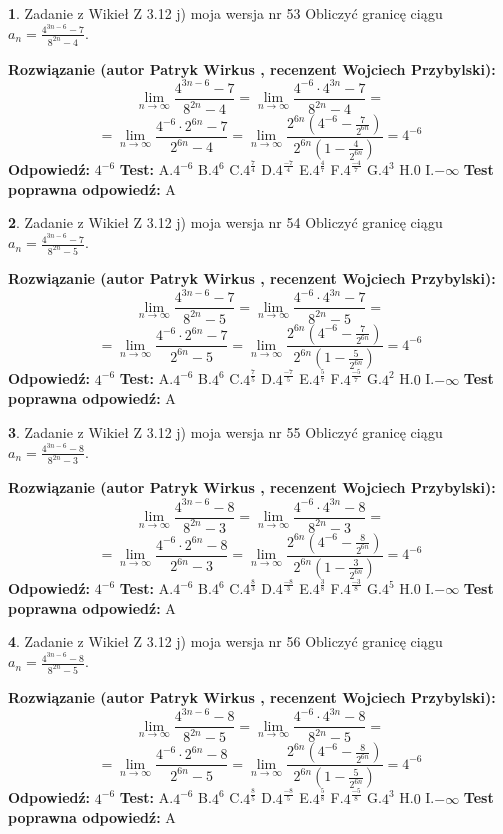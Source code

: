 \documentclass[12pt, a4paper]{article}
\theoremstyle{definition} %
\newtheorem{zad}{}
\newcommand{\zadStart}[1]{\begin{zad}#1\newline}
\newcommand{\zadStop}{\end{zad}}
\newcommand{\rozwStart}[2]{\noindent \textbf{Rozwiązanie (autor #1 , recenzent #2): }\newline}
\newcommand{\rozwStop}{\newline}
\newcommand{\odpStart}{\noindent \textbf{Odpowiedź:}\newline}
\newcommand{\odpStop}{\newline}
\newcommand{\testStart}{\noindent \textbf{Test:}\newline}
\newcommand{\testStop}{\newline}
\newcommand{\kluczStart}{\noindent \textbf{Test poprawna odpowiedź:}\newline}
\newcommand{\kluczStop}{\newline}
\begin{document}
\zadStart{Zadanie z Wikieł Z 3.12 j) moja wersja nr 53}
Obliczyć granicę ciągu $a_{n}=\frac{4^{3n-6}-7}{8^{2n}-4}$.
\zadStop
\rozwStart{Patryk Wirkus}{Wojciech Przybylski}
$$\lim\limits_{n\to\infty}\frac{4^{3n-6}-7}{8^{2n}-4}= \lim\limits_{n\to\infty}\frac{4^{-6} \cdot 4^{3n}-7}{8^{2n}-4}=$$
$$= \lim\limits_{n\to\infty}\frac{4^{-6} \cdot 2^{6n}-7}{2^{6n}-4}= \lim\limits_{n\to\infty}\frac{2^{6n}(4^{-6} - \frac{7}{2^{6n}})}{2^{6n}(1-\frac{4}{2^{6n}})}= 4^{-6}$$
\rozwStop
\odpStart
$4^{-6}$
\odpStop
\testStart
A.$4^{-6}$
B.$4^{6}$
C.$4^{\frac{7}{4}}$
D.$4^{\frac{-7}{4}}$
E.$4^{\frac{4}{7}}$
F.$4^{\frac{-4}{7}}$
G.$4^{3}$
H.$0$
I.$-\infty$
\testStop
\kluczStart
A
\kluczStop



\zadStart{Zadanie z Wikieł Z 3.12 j) moja wersja nr 54}
Obliczyć granicę ciągu $a_{n}=\frac{4^{3n-6}-7}{8^{2n}-5}$.
\zadStop
\rozwStart{Patryk Wirkus}{Wojciech Przybylski}
$$\lim\limits_{n\to\infty}\frac{4^{3n-6}-7}{8^{2n}-5}= \lim\limits_{n\to\infty}\frac{4^{-6} \cdot 4^{3n}-7}{8^{2n}-5}=$$
$$= \lim\limits_{n\to\infty}\frac{4^{-6} \cdot 2^{6n}-7}{2^{6n}-5}= \lim\limits_{n\to\infty}\frac{2^{6n}(4^{-6} - \frac{7}{2^{6n}})}{2^{6n}(1-\frac{5}{2^{6n}})}= 4^{-6}$$
\rozwStop
\odpStart
$4^{-6}$
\odpStop
\testStart
A.$4^{-6}$
B.$4^{6}$
C.$4^{\frac{7}{5}}$
D.$4^{\frac{-7}{5}}$
E.$4^{\frac{5}{7}}$
F.$4^{\frac{-5}{7}}$
G.$4^{2}$
H.$0$
I.$-\infty$
\testStop
\kluczStart
A
\kluczStop



\zadStart{Zadanie z Wikieł Z 3.12 j) moja wersja nr 55}
Obliczyć granicę ciągu $a_{n}=\frac{4^{3n-6}-8}{8^{2n}-3}$.
\zadStop
\rozwStart{Patryk Wirkus}{Wojciech Przybylski}
$$\lim\limits_{n\to\infty}\frac{4^{3n-6}-8}{8^{2n}-3}= \lim\limits_{n\to\infty}\frac{4^{-6} \cdot 4^{3n}-8}{8^{2n}-3}=$$
$$= \lim\limits_{n\to\infty}\frac{4^{-6} \cdot 2^{6n}-8}{2^{6n}-3}= \lim\limits_{n\to\infty}\frac{2^{6n}(4^{-6} - \frac{8}{2^{6n}})}{2^{6n}(1-\frac{3}{2^{6n}})}= 4^{-6}$$
\rozwStop
\odpStart
$4^{-6}$
\odpStop
\testStart
A.$4^{-6}$
B.$4^{6}$
C.$4^{\frac{8}{3}}$
D.$4^{\frac{-8}{3}}$
E.$4^{\frac{3}{8}}$
F.$4^{\frac{-3}{8}}$
G.$4^{5}$
H.$0$
I.$-\infty$
\testStop
\kluczStart
A
\kluczStop



\zadStart{Zadanie z Wikieł Z 3.12 j) moja wersja nr 56}
Obliczyć granicę ciągu $a_{n}=\frac{4^{3n-6}-8}{8^{2n}-5}$.
\zadStop
\rozwStart{Patryk Wirkus}{Wojciech Przybylski}
$$\lim\limits_{n\to\infty}\frac{4^{3n-6}-8}{8^{2n}-5}= \lim\limits_{n\to\infty}\frac{4^{-6} \cdot 4^{3n}-8}{8^{2n}-5}=$$
$$= \lim\limits_{n\to\infty}\frac{4^{-6} \cdot 2^{6n}-8}{2^{6n}-5}= \lim\limits_{n\to\infty}\frac{2^{6n}(4^{-6} - \frac{8}{2^{6n}})}{2^{6n}(1-\frac{5}{2^{6n}})}= 4^{-6}$$
\rozwStop
\odpStart
$4^{-6}$
\odpStop
\testStart
A.$4^{-6}$
B.$4^{6}$
C.$4^{\frac{8}{5}}$
D.$4^{\frac{-8}{5}}$
E.$4^{\frac{5}{8}}$
F.$4^{\frac{-5}{8}}$
G.$4^{3}$
H.$0$
I.$-\infty$
\testStop
\kluczStart
A
\kluczStop
\end{document}
